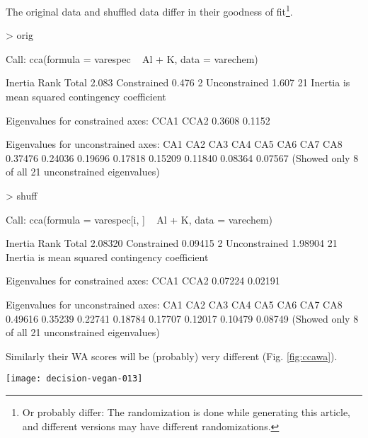 \documentclass[a4paper,10pt]{amsart}
\begin{document}
The original data and shuffled data differ in their goodness of
fit\footnote{Or probably differ: The randomization is done while
generating this article, and different versions may have different
randomizations.}.
\begin{Schunk}
\begin{Sinput}
> orig
\end{Sinput}
\begin{Soutput}
Call: cca(formula = varespec ~ Al + K, data = varechem)

              Inertia Rank
Total           2.083     
Constrained     0.476    2
Unconstrained   1.607   21
Inertia is mean squared contingency coefficient 

Eigenvalues for constrained axes:
  CCA1   CCA2 
0.3608 0.1152 

Eigenvalues for unconstrained axes:
    CA1     CA2     CA3     CA4     CA5     CA6     CA7     CA8 
0.37476 0.24036 0.19696 0.17818 0.15209 0.11840 0.08364 0.07567 
(Showed only 8 of all 21 unconstrained eigenvalues)
\end{Soutput}
\begin{Sinput}
> shuff
\end{Sinput}
\begin{Soutput}
Call: cca(formula = varespec[i, ] ~ Al + K, data = varechem)

              Inertia Rank
Total         2.08320     
Constrained   0.09415    2
Unconstrained 1.98904   21
Inertia is mean squared contingency coefficient 

Eigenvalues for constrained axes:
   CCA1    CCA2 
0.07224 0.02191 

Eigenvalues for unconstrained axes:
    CA1     CA2     CA3     CA4     CA5     CA6     CA7     CA8 
0.49616 0.35239 0.22741 0.18784 0.17707 0.12017 0.10479 0.08749 
(Showed only 8 of all 21 unconstrained eigenvalues)
\end{Soutput}
\end{Schunk}
Similarly their WA scores will be (probably) very different
(Fig. \ref{fig:ccawa}).
\begin{SCfigure}
\texttt{[image: decision-vegan-013]}
\caption{Procrustes rotation of WA scores of CCA with the original and
  shuffled data.}
\label{fig:ccawa}
\end{SCfigure}
\end{document}

